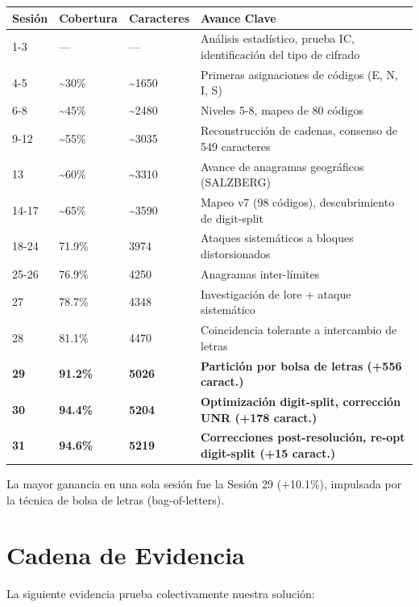 \documentclass[11pt,a4paper]{article}
\begin{document}
\begin{table}[h]
\centering
\begin{tabular}{llll}
\toprule
Sesi\'{o}n & Cobertura & Caracteres & Avance Clave \\
\midrule
1-3 & --- & --- & An\'{a}lisis estad\'{i}stico, prueba IC, identificaci\'{o}n del tipo de cifrado \\
4-5 & \~{}30\% & \~{}1650 & Primeras asignaciones de c\'{o}digos (E, N, I, S) \\
6-8 & \~{}45\% & \~{}2480 & Niveles 5-8, mapeo de 80 c\'{o}digos \\
9-12 & \~{}55\% & \~{}3035 & Reconstrucci\'{o}n de cadenas, consenso de 549 caracteres \\
13 & \~{}60\% & \~{}3310 & Avance de anagramas geogr\'{a}ficos (SALZBERG) \\
14-17 & \~{}65\% & \~{}3590 & Mapeo v7 (98 c\'{o}digos), descubrimiento de digit-split \\
18-24 & 71.9\% & 3974 & Ataques sistem\'{a}ticos a bloques distorsionados \\
25-26 & 76.9\% & 4250 & Anagramas inter-l\'{i}mites \\
27 & 78.7\% & 4348 & Investigaci\'{o}n de lore + ataque sistem\'{a}tico \\
28 & 81.1\% & 4470 & Coincidencia tolerante a intercambio de letras \\
\textbf{29} & \textbf{91.2\%} & \textbf{5026} & \textbf{Partici\'{o}n por bolsa de letras (+556 caract.)} \\
\textbf{30} & \textbf{94.4\%} & \textbf{5204} & \textbf{Optimizaci\'{o}n digit-split, correcci\'{o}n UNR (+178 caract.)} \\
\textbf{31} & \textbf{94.6\%} & \textbf{5219} & \textbf{Correcciones post-resoluci\'{o}n, re-opt digit-split (+15 caract.)} \\
\bottomrule
\end{tabular}
\end{table}

La mayor ganancia en una sola sesi\'{o}n fue la Sesi\'{o}n 29 (+10.1\%), impulsada por la t\'{e}cnica de bolsa de letras (bag-of-letters).

\section{Cadena de Evidencia}

La siguiente evidencia prueba colectivamente nuestra soluci\'{o}n:
\end{document}
